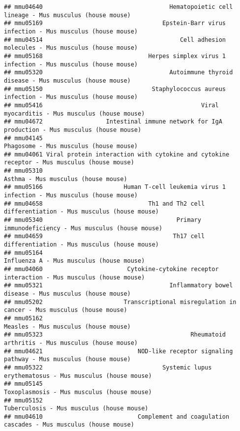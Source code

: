 \documentclass[
]{article}
\begin{document}
\begin{verbatim}
## mmu04640                                    Hematopoietic cell lineage - Mus musculus (house mouse)
## mmu05169                                  Epstein-Barr virus infection - Mus musculus (house mouse)
## mmu04514                                       Cell adhesion molecules - Mus musculus (house mouse)
## mmu05168                              Herpes simplex virus 1 infection - Mus musculus (house mouse)
## mmu05320                                    Autoimmune thyroid disease - Mus musculus (house mouse)
## mmu05150                               Staphylococcus aureus infection - Mus musculus (house mouse)
## mmu05416                                             Viral myocarditis - Mus musculus (house mouse)
## mmu04672                  Intestinal immune network for IgA production - Mus musculus (house mouse)
## mmu04145                                                     Phagosome - Mus musculus (house mouse)
## mmu04061 Viral protein interaction with cytokine and cytokine receptor - Mus musculus (house mouse)
## mmu05310                                                        Asthma - Mus musculus (house mouse)
## mmu05166                       Human T-cell leukemia virus 1 infection - Mus musculus (house mouse)
## mmu04658                              Th1 and Th2 cell differentiation - Mus musculus (house mouse)
## mmu05340                                      Primary immunodeficiency - Mus musculus (house mouse)
## mmu04659                                     Th17 cell differentiation - Mus musculus (house mouse)
## mmu05164                                                   Influenza A - Mus musculus (house mouse)
## mmu04060                        Cytokine-cytokine receptor interaction - Mus musculus (house mouse)
## mmu05321                                    Inflammatory bowel disease - Mus musculus (house mouse)
## mmu05202                       Transcriptional misregulation in cancer - Mus musculus (house mouse)
## mmu05162                                                       Measles - Mus musculus (house mouse)
## mmu05323                                          Rheumatoid arthritis - Mus musculus (house mouse)
## mmu04621                           NOD-like receptor signaling pathway - Mus musculus (house mouse)
## mmu05322                                  Systemic lupus erythematosus - Mus musculus (house mouse)
## mmu05145                                                 Toxoplasmosis - Mus musculus (house mouse)
## mmu05152                                                  Tuberculosis - Mus musculus (house mouse)
## mmu04610                           Complement and coagulation cascades - Mus musculus (house mouse)

\end{verbatim}
\end{document}
